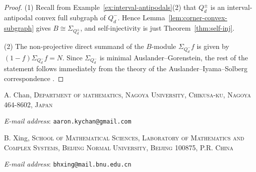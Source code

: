 \documentclass[a4paper,leqno]{amsart}
\makeatletter
\newcommand{\Addresses}{{%
  \bigskip
  \footnotesize

  A. Chan, \textsc{Department of mathematics, Nagoya University, Chikusa-ku, Nagoya 464-8602, Japan}\par\nopagebreak
  \textit{E-mail address}: \texttt{aaron.kychan@gmail.com}

  \medskip

  B. Xing, \textsc{School of Mathematical Sciences, Laboratory of Mathematics and Complex Systems, Beijing Normal University, Beijing 100875, P.R. China}\par\nopagebreak
\textit{E-mail address}: \texttt{bhxing@mail.bnu.edu.cn}
}}
\makeatother
\begin{document}
\begin{proof}
(1) Recall from Example~\ref{ex:interval-antipodals}(2) that $Q_d^{\pm}$ is an interval-antipodal convex full subgraph of $Q_d^{-}$. Hence
Lemma~\ref{lem:corner-convex-subgraph} gives
$B\cong\Sigma_{Q_d^{\pm}}$, and self-injectivity is just Theorem~\ref{thm:self-inj}.

(2) The non-projective direct summand of the $B$-module $\Sigma_{Q_d^-}f$ is given by $(1-f)\Sigma_{Q_d^-} f = N$.  
Since $\Sigma_{Q_d^-}$ is minimal Auslander--Gorenstein, the rest of the statement follows immediately from the theory of the Auslander--Iyama--Solberg correspondence \cite[Proposition~4.4, Theorem~4.5, Section 6]{IS18}.
\end{proof}






\Addresses
\end{document}
